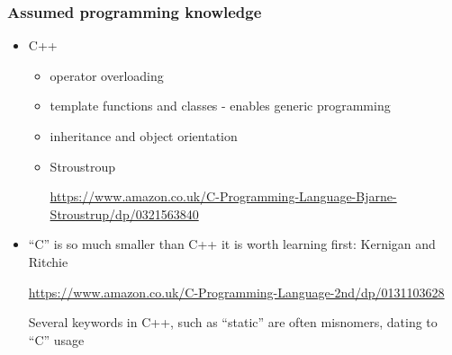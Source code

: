 \documentclass[pdf,ps,8pt]{beamer}
\newcommand{\link}[1]{\href{#1}{ {\color{blue} #1} }}
\begin{document}
\begin{frame}[fragile]\small\frametitle{ Assumed programming knowledge  }

  \begin{itemize} \item C++
    \begin{itemize}
    \item operator overloading 
    \item template functions and classes - enables generic programming
    \item inheritance and object orientation
    \item Stroustroup\\
      \begin{center}\link{https://www.amazon.co.uk/C-Programming-Language-Bjarne-Stroustrup/dp/0321563840}\end{center} 
    \end{itemize}
  \item ``C'' is so much smaller than C++ it is worth learning first: Kernigan and Ritchie\\
          \begin{center}\link{https://www.amazon.co.uk/C-Programming-Language-2nd/dp/0131103628}\end{center} 
      Several keywords in C++, such as ``static'' are often misnomers, dating to ``C'' usage
  \end{itemize}
  
\end{frame}
\end{document}
